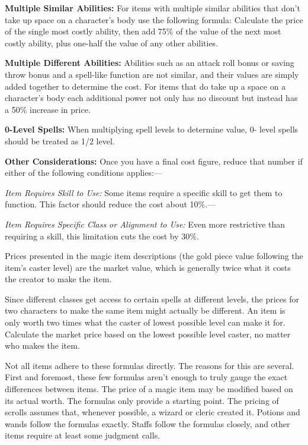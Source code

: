 \documentclass{article}
\begin{document}
\textbf{Multiple Similar Abilities: }For items with multiple similar abilities 
that don't take up space on a character's body use the following formula: Calculate 
the price of the single most costly ability, then add 75\% of the value of the 
next most costly ability, plus one-half the value of any other abilities.

\textbf{Multiple Different Abilities: }Abilities such as an attack roll bonus or 
saving throw bonus and a spell-like function are not similar, and their values 
are simply added together to determine the cost. For items that do take up a space 
on a character's body each additional power not only has no discount but instead 
has a 50\% increase in price.

\textbf{0-Level Spells: }When multiplying spell levels to determine value, 0- level 
spells should be treated as 1/2 level.

\textbf{Other Considerations: }Once you have a final cost figure, reduce that number 
if either of the following conditions applies:---

\textit{Item Requires Skill to Use: }Some items require a specific skill to get 
them to function. This factor should reduce the cost about 10\%.---

\textit{Item Requires Specific Class or Alignment to Use: }Even more restrictive 
than requiring a skill, this limitation cuts the cost by 30\%.

Prices presented in the magic item descriptions (the gold piece value following 
the item's caster level) are the market value, which is generally twice what it 
costs the creator to make the item.

Since different classes get access to certain spells at different levels, the prices 
for two characters to make the same item might actually be different. An item is 
only worth two times what the caster of lowest possible level can make it for. 
Calculate the market price based on the lowest possible level caster, no matter 
who makes the item.

Not all items adhere to these formulas directly. The reasons for this are several. 
First and foremost, these few formulas aren't enough to truly gauge the exact differences 
between items. The price of a magic item may be modified based on its actual worth. 
The formulas only provide a starting point. The pricing of scrolls assumes that, 
whenever possible, a wizard or cleric created it. Potions and wands follow the 
formulas exactly. Staffs follow the formulas closely, and other items require at 
least some judgment calls.
\end{document}
